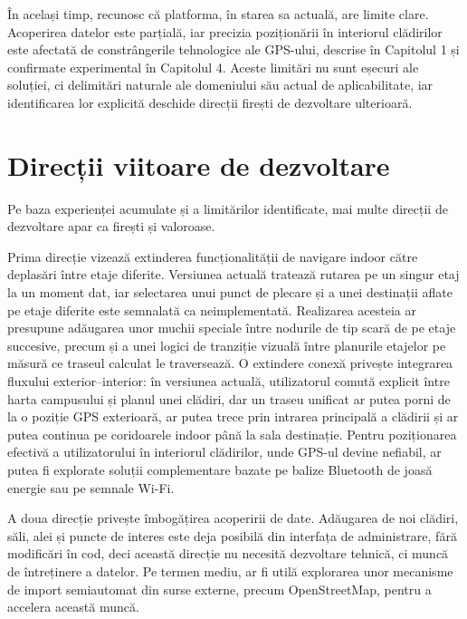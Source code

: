 În același timp, recunosc că platforma, în starea sa actuală, are limite clare.
Acoperirea datelor este parțială, iar precizia poziționării în interiorul
clădirilor este afectată de constrângerile tehnologice ale GPS-ului, descrise
în Capitolul 1 și confirmate experimental în Capitolul 4. Aceste limitări nu
sunt eșecuri ale soluției, ci delimitări naturale ale domeniului său actual de
aplicabilitate, iar identificarea lor explicită deschide direcții firești de
dezvoltare ulterioară.

\section*{Direcții viitoare de dezvoltare}

Pe baza experienței acumulate și a limitărilor identificate, mai multe direcții
de dezvoltare apar ca firești și valoroase.

Prima direcție vizează extinderea funcționalității de navigare indoor către
deplasări între etaje diferite. Versiunea actuală tratează rutarea pe un
singur etaj la un moment dat, iar selectarea unui punct de plecare și a unei
destinații aflate pe etaje diferite este semnalată ca neimplementată.
Realizarea acesteia ar presupune adăugarea unor muchii speciale între nodurile
de tip scară de pe etaje succesive, precum și a unei logici de tranziție
vizuală între planurile etajelor pe măsură ce traseul calculat le traversează.
O extindere conexă privește integrarea fluxului exterior–interior: în
versiunea actuală, utilizatorul comută explicit între harta campusului și
planul unei clădiri, dar un traseu unificat ar putea porni de la o poziție
GPS exterioară, ar putea trece prin intrarea principală a clădirii și ar
putea continua pe coridoarele indoor până la sala destinație. Pentru
poziționarea efectivă a utilizatorului în interiorul clădirilor, unde GPS-ul
devine nefiabil, ar putea fi explorate soluții complementare bazate pe balize
Bluetooth de joasă energie sau pe semnale Wi-Fi.

A doua direcție privește îmbogățirea acoperirii de date. Adăugarea de noi
clădiri, săli, alei și puncte de interes este deja posibilă din interfața de
administrare, fără modificări în cod, deci această direcție nu necesită
dezvoltare tehnică, ci muncă de întreținere a datelor. Pe termen mediu, ar fi
utilă explorarea unor mecanisme de import semiautomat din surse externe, precum
OpenStreetMap, pentru a accelera această muncă.


